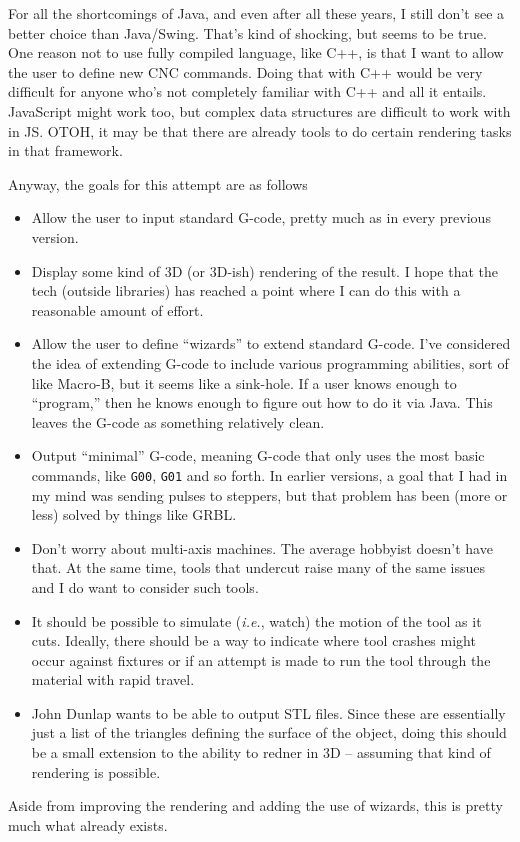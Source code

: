 \documentclass{article}
\begin{document}
For all the shortcomings of Java, and even after all these years, I
still don't see a better choice than Java/Swing. That's kind of
shocking, but seems to be true. One reason not to use fully compiled
language, like C++, is that I want to allow the user to define new CNC
commands. Doing that with C++ would be very difficult for anyone who's
not completely familiar with C++ and all it entails. JavaScript might
work too, but complex data structures are difficult to work with in
JS. OTOH, it may be that there are already tools to do certain
rendering tasks in that framework.

Anyway, the goals for this attempt are as follows
\begin{itemize}[itemsep = -3pt,leftmargin=*]
\item Allow the user to input standard G-code, pretty much as in every
  previous version.
\item Display some kind of 3D (or 3D-ish) rendering of the result. I
  hope that the tech (outside libraries) has reached a point where I
  can do this with a reasonable amount of effort.
\item Allow the user to define ``wizards'' to extend standard
  G-code. I've considered the idea of extending G-code to include
  various programming abilities, sort of like Macro-B, but it seems
  like a sink-hole. If a user knows enough to ``program,'' then he
  knows enough to figure out how to do it via Java. This leaves the
  G-code as something relatively clean.
\item Output ``minimal'' G-code, meaning G-code that only uses the
  most basic commands, like {\tt G00}, {\tt G01} and so forth. In
  earlier versions, a goal that I had in my mind was sending pulses to
  steppers, but that problem has been (more or less) solved by things
  like GRBL.
\item Don't worry about multi-axis machines. The average hobbyist
  doesn't have that. At the same time, tools that undercut raise many
  of the same issues and I do want to consider such tools.
\item It should be possible to simulate (\emph{i.e.}, watch) the
  motion of the tool as it cuts. Ideally, there should be a way to
  indicate where tool crashes might occur against fixtures or if an
  attempt is made to run the tool through the material with rapid
  travel.
\item John Dunlap wants to be able to output STL files. Since these
  are essentially just a list of the triangles defining the surface of
  the object, doing this should be a small extension to the ability to
  redner in 3D -- assuming that kind of rendering is possible.
\end{itemize}
Aside from improving the rendering and adding the use of wizards, this
is pretty much what already exists.
\end{document}
